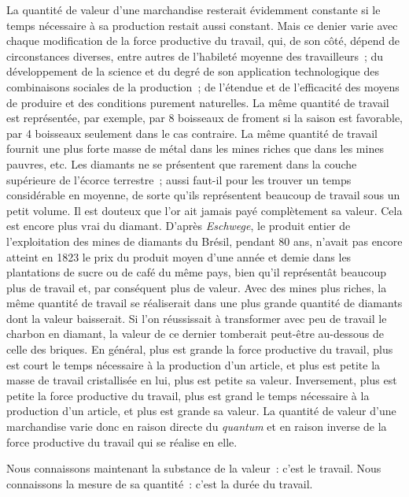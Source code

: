 \documentclass[french,twoside]{book} %
\begin{document}
La quantité de valeur d’une marchandise resterait évidemment constante si le temps nécessaire à sa production restait aussi constant. Mais ce denier varie avec chaque modification de la force productive du travail, qui, de son côté, dépend de circonstances diverses, entre autres de l’habileté moyenne des travailleurs ; du développement de la science et du degré de son application technologique des combinaisons sociales de la production ; de l’étendue et de l’efficacité des moyens de produire et des conditions purement naturelles. La même quantité de travail est représentée, par exemple, par 8 boisseaux de froment si la saison est favorable, par 4 boisseaux seulement dans le cas contraire. La même quantité de travail fournit une plus forte masse de métal dans les mines riches que dans les mines pauvres, etc. Les diamants ne se présentent que rarement dans la couche supérieure de l’écorce terrestre ; aussi faut-il pour les trouver un temps considérable en moyenne, de sorte qu’ils représentent beaucoup de travail sous un petit volume. Il est douteux que l’or ait jamais payé complètement sa valeur. Cela est encore plus vrai du diamant. D’après \emph{Eschwege}, le produit entier de l’exploitation des mines de diamants du Brésil, pendant 80 ans, n’avait pas encore atteint en 1823 le prix du produit moyen d’une année et demie dans les plantations de sucre ou de café du même pays, bien qu’il représentât beaucoup plus de travail et, par conséquent plus de valeur. Avec des mines plus riches, la même quantité de travail se réaliserait dans une plus grande quantité de diamants dont la valeur baisserait. Si l’on réussissait à transformer avec peu de travail le charbon en diamant, la valeur de ce dernier tomberait peut-être au-dessous de celle des briques. En général, plus est grande la force productive du travail, plus est court le temps nécessaire à la production d’un article, et plus est petite la masse de travail cristallisée en lui, plus est petite sa valeur. Inversement, plus est petite la force productive du travail, plus est grand le temps nécessaire à la production d’un article, et plus est grande sa valeur. La quantité de valeur d’une marchandise varie donc en raison directe du \emph{quantum} et en raison inverse de la force productive du travail qui se réalise en elle.\par
Nous connaissons maintenant la substance de la valeur : c’est le travail. Nous connaissons la mesure de sa quantité : c’est la durée du travail.\par
\end{document}
